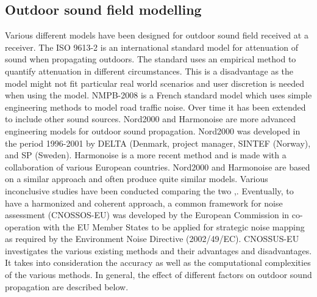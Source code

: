 \subsection{Outdoor sound field modelling}
Various different models have been designed for outdoor sound field received at a receiver. The ISO 9613-2 \cite{ISO9613} is an international standard model for attenuation of sound when propagating outdoors. The standard uses an empirical method to quantify attenuation in different circumstances. This is a disadvantage as the model might not fit particular real world scenarios and user discretion is needed when using the model. NMPB-2008 \cite{dutilleux2010nmpb} is a French standard model which uses simple engineering methods to model road traffic noise. Over time it has been extended to include other sound sources. Nord2000 \cite{plovsing2000nord2000} and Harmonoise \cite{defrance2007outdoor} are more advanced engineering models for outdoor sound propagation. Nord2000 was developed in the period 1996-2001 by DELTA (Denmark, project manager, SINTEF (Norway), and SP (Sweden). Harmonoise is a more recent method and is made with a collaboration of various European countries. Nord2000 and Harmonoise are based on a similar approach and often produce quite similar models. Various inconclusive studies have been conducted comparing the two \cite{garg2014critical},\cite{jonsson2008comparison}. Eventually, to have a harmonized and coherent approach, a common framework for noise assessment (CNOSSOS-EU) was developed by the European Commission \cite{kephalopoulos2012common} in co-operation with the EU Member States to be applied for strategic noise mapping as required by the Environment Noise Directive (2002/49/EC). CNOSSUS-EU investigates the various existing methods and their advantages and disadvantages. It takes into consideration the accuracy as well as the computational complexities of the various methods. In general, the effect of different factors on outdoor sound propagation are described below.
